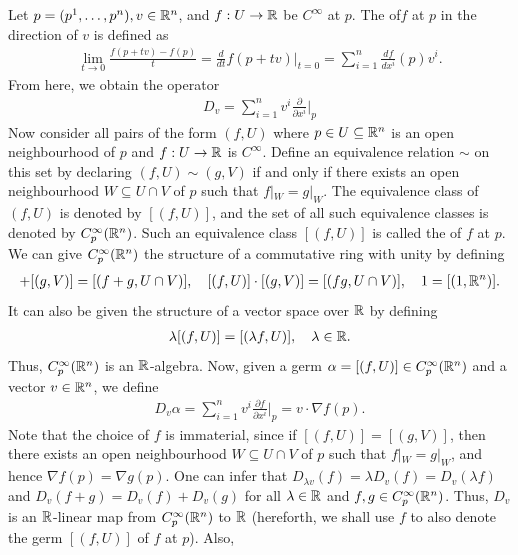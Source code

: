 Let $p = (p^{1},\ldots,p^{n}), v \in \mathbb{R}^{n}$, and $f:U \to \mathbb{R}$ be $C^{\infty}$ at $p$. The  of$ f$ at $p$ in the direction of $v$ is defined as
\begin{align}
    \lim_{t \to 0} \frac{f(p+tv)-f(p)}{t} = \frac{d}{dt}f(p+tv)\Big|_{t=0} = \sum_{i=1}^{n} \frac{df}{dx^{i}}(p)v^{i}.
\end{align}
From here, we obtain the operator
\begin{align}
    D_{v} = \sum_{i=1}^{n} v^{i} \frac{\partial}{\partial x^{i}}\Big|_{p}
\end{align}
Now consider all pairs of the form $(f,U)$ where $p \in U \subseteq \mathbb{R}^{n}$ is an open neighbourhood of $p$ and $f:U \to \mathbb{R}$ is $C^{\infty}$. Define an equivalence relation $\sim$ on this set by declaring $(f,U) \sim (g,V)$ if and only if there exists an open neighbourhood $W \subseteq U \cap V$ of $p$ such that $f|_{W} = g|_{W}$. The equivalence class of $(f,U)$ is denoted by $[(f,U)]$, and the set of all such equivalence classes is denoted by $C^{\infty}_{p}(\mathbb{R}^{n})$. Such an equivalence class $[(f,U)]$ is called the  of $f$ at $p$. We can give $C^{\infty}_{p}(\mathbb{R}^{n})$ the structure of a commutative ring with unity by defining
\begin{align}
    [(f,U)] + [(g,V)] = [(f+g,U \cap V)], \quad [(f,U)] \cdot [(g,V)] = [(fg,U \cap V)], \quad 1 = [(1,\R^{n})].
\end{align}
It can also be given the structure of a vector space over $\mathbb{R}$ by defining
\begin{align}
    \lambda [(f,U)] = [(\lambda f,U)], \quad \lambda \in \mathbb{R}.
\end{align}
Thus, $C^{\infty}_{p}(\mathbb{R}^{n})$ is an $\mathbb{R}$-algebra. Now, given a germ $\alpha = [(f,U)] \in C^{\infty}_{p}(\mathbb{R}^{n})$ and a vector $v \in \mathbb{R}^{n}$, we define
\begin{align}
    D_{v}\alpha = \sum_{i=1}^{n} v^{i} \frac{\partial f}{\partial x^{i}}\Big|_{p} = v \cdot \nabla f(p).
\end{align}
Note that the choice of $f$ is immaterial, since if $[(f,U)] = [(g,V)]$, then there exists an open neighbourhood $W \subseteq U \cap V$ of $p$ such that $f|_{W} = g|_{W}$, and hence $\nabla f(p) = \nabla g(p)$.
One can infer that $D_{\lambda v}(f) = \lambda D_{v}(f) = D_{v}(\lambda f)$ and $D_{v}(f+g) = D_{v}(f) + D_{v}(g)$ for all $\lambda \in \mathbb{R}$ and $f,g \in C^{\infty}_{p}(\mathbb{R}^{n})$. Thus, $D_{v}$ is an $\mathbb{R}$-linear map from $C^{\infty}_{p}(\mathbb{R}^{n})$ to $\mathbb{R}$ (hereforth, we shall use $f$ to also denote the germ $[(f,U)]$ of $f$ at $p$). Also,
